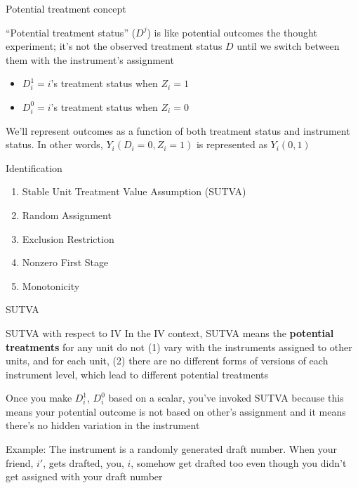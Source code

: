 \documentclass{beamer}
\begin{document}
\begin{frame}{Potential treatment concept}
	
``Potential treatment status'' ($D^j$) is like potential outcomes the thought experiment; it's not the observed treatment status $D$ until we switch between them with the instrument's assignment
\bigskip
		\begin{itemize}
		\item $D^1_{i} = i$'s treatment status when $Z_i=1$
		\item $D^0_{i} = i$'s treatment status when $Z_i=0$
		\end{itemize}
\bigskip
We'll represent outcomes as a function of both treatment status and instrument status. In other words, $Y_i(D_i=0,Z_i=1)$ is represented as $Y_i(0,1)$

\end{frame}




\begin{frame}{Identification}
		
	\begin{enumerate}
	\item Stable Unit Treatment Value Assumption (SUTVA)
	\item Random Assignment
	\item Exclusion Restriction
	\item Nonzero First Stage
	\item Monotonicity
	\end{enumerate}
\end{frame}


\begin{frame}{SUTVA}

\begin{block}{SUTVA with respect to IV}
In the IV context, SUTVA means the \textbf{potential treatments} for any unit do not (1) vary with the instruments assigned to other units, and for each unit, (2) there are no different forms of versions of each instrument level, which lead to different potential treatments
\end{block}

\bigskip

Once you make $D^1_i$, $D^0_i$ based on a scalar, you've invoked SUTVA because this means your potential outcome is not based on other's assignment and it means there's no hidden variation in the instrument

\bigskip

Example:   The instrument is a randomly generated draft number. When your friend, $i'$, gets drafted, you, $i$, somehow get drafted too even though you didn't get assigned with your draft number


\end{frame}
\end{document}
